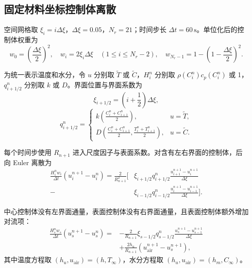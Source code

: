 \documentclass[withoutpreface,bwprint]{cumcm_thesis}
\begin{document}
\subsection{固定材料坐标控制体离散}

空间网格取 \(\xi_i = i\Delta\xi\)，\(\Delta\xi = 0.05\)，\(N_r = 21\)；时间步长 \(\Delta t = 60\,\text{s}\)。单位化后的控制体权重为
\begin{equation}
w_0 = \left(\frac{\Delta\xi}{2}\right)^2, \quad
w_i = 2\xi_i\Delta\xi \quad (1 \le i \le N_r-2), \quad
w_{N_r-1} = 1 - \left(1 - \frac{\Delta\xi}{2}\right)^2.
\end{equation}

为统一表示温度和水分，令 \(u\) 分别取 \(\tilde{T}\) 或 \(\tilde{C}\)，\(H_i^n\) 分别取 \(\rho(C_i^n)c_p(C_i^n)\) 或 1，\(q_{i+1/2}^n\) 分别取 \(k\) 或 \(D\)。界面位置与界面系数为
\begin{equation}
\xi_{i+1/2} = \left(i + \frac{1}{2}\right)\Delta\xi,
\end{equation}
\begin{equation}
q_{i+1/2}^n = 
\begin{cases}
k\left(\frac{C_i^n + C_{i+1}^n}{2}\right), & u = \tilde{T}, \\[4pt]
D\left(\frac{C_i^n + C_{i+1}^n}{2}, \frac{T_i^n + T_{i+1}^n}{2}\right), & u = \tilde{C}.
\end{cases}
\end{equation}

每个时间步使用 \(R_{n+1}\) 进入尺度因子与表面系数。对含有左右界面的控制体，后向 Euler 离散为
\begin{equation}
\begin{aligned}
\frac{H_i^n w_i}{\Delta t}(u_i^{n+1} - u_i^n) = \frac{2}{R_{n+1}^2} \Bigg[ &\xi_{i+1/2} q_{i+1/2}^n \frac{u_{i+1}^{n+1} - u_i^{n+1}}{\Delta\xi} \\
- &\xi_{i-1/2} q_{i-1/2}^n \frac{u_i^{n+1} - u_{i-1}^{n+1}}{\Delta\xi} \Bigg].
\end{aligned}
\end{equation}

中心控制体没有左界面通量，表面控制体没有右界面通量，且表面控制体额外增加对流项：
\begin{equation}
\begin{aligned}
\frac{H_s^n w_s}{\Delta t}(u_s^{n+1} - u_s^n) = &-\frac{2}{R_{n+1}}\xi_{s-1/2} q_{s-1/2}^n \frac{u_s^{n+1} - u_{s-1}^{n+1}}{\Delta\xi} \\
&+ \frac{2h_u}{R_{n+1}}\left(u_{\text{air}}^{n+1} - u_s^{n+1}\right),
\end{aligned}
\end{equation}
其中温度方程取 \((h_u, u_{\text{air}}) = (h, T_\infty)\)，水分方程取 \((h_u, u_{\text{air}}) = (h_m, C_\infty)\)。
\end{document}
